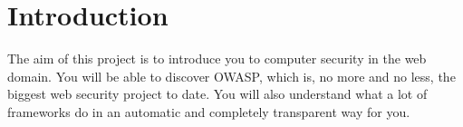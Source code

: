 
\makeindex



\renewcommand{\sectionmark}[1]{\markright{\spacedlowsmallcaps{#1}}} %
\lehead{\mbox{\llap{\small\thepage\kern1em\color{halfgray} \vline}\color{halfgray}\hspace{0.5em}\rightmark\hfil}} %

\pagestyle{scrheadings} %



\newpage

\setcounter{tocdepth}{3} %

\tableofcontents %

\newpage





\newpage

\section{Introduction}

The aim of this project is to introduce you to computer security in the web domain.
You will be able to discover OWASP, which is, no more and no less, the biggest web
security project to date.
You will also understand what a lot of frameworks do in an automatic and completely
transparent way for you.

